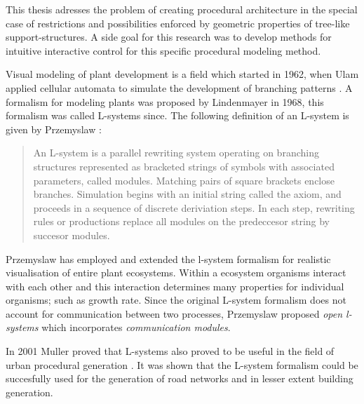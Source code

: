 This thesis adresses the problem of creating procedural architecture in the special case of restrictions and possibilities enforced by geometric properties of tree-like support-structures. A side goal for this research was to develop methods for intuitive interactive control for this specific procedural modeling method. 



Visual modeling of plant development is a field which started in 1962, when Ulam applied cellular automata to 
simulate the development of branching patterns \citep{PrzemyslawPlants}. A formalism for modeling plants was proposed by Lindenmayer 
in 1968, this formalism was called L-systems since. The following definition of an L-system is given by Przemyslaw \citep{PrzemyslawPlants}: 

\begin{quote}
An L-system is a parallel rewriting system operating on branching structures represented as bracketed strings of symbols with associated parameters, called modules. Matching pairs of square brackets enclose branches. Simulation begins with an  initial string called the axiom, and proceeds in a sequence of discrete deriviation steps. In each step, rewriting rules or productions replace all modules on the predeccesor string by succesor modules.   
\end{quote}   

Przemyslaw \citep{PrzemyslawPlants} has employed and extended the l-system formalism for realistic visualisation of entire plant ecosystems. Within a ecosystem organisms interact with each other and this interaction determines many properties for individual organisms; such as growth rate. Since the original L-system formalism does not account for communication between two processes, Przemyslaw proposed \emph{open l-systems} which incorporates \emph{communication modules}.    
  
In 2001 Muller proved that L-systems also proved to be useful in the field of urban procedural generation \citep{Wonka03}. It was shown that the L-system formalism could be succesfully used for the generation of road networks and in lesser extent building generation. 

